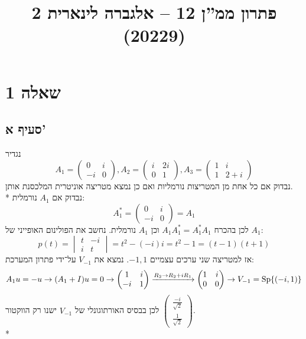 

\title{פתרון ממ''ן 12 – אלגברה לינארית 2 (20229)}


\maketitle

\section{שאלה 1}
\subsection{סעיף א'}
נגדיר
\[
	A_1 = \begin{pmatrix}
		0 & i \\
		-i & 0
	\end{pmatrix},
	A_2 = \begin{pmatrix}
		i & 2i \\
		0 & 1
	\end{pmatrix},
	A_3 = \begin{pmatrix}
		1 & i \\
		1 & 2 + i
	\end{pmatrix}
\]
נבדוק אם כל אחת מן המטריצות נורמליות ואם כן נמצא מטריצה אוניטרית המלכסנת אותן. \\*
נבדוק אם $A_1$ נורמלית:
\[
	A_1^* = \begin{pmatrix}
		0 & i \\
		-i & 0
	\end{pmatrix} = A_1
\]
לכן בהכרח $A_1 A_1^* = A_1^* A_1$ וכן $A_1$ נורמלית.
נחשב את הפולינום האופייני של $A_1$:
\[
	p(t) = \begin{vmatrix}
		t & -i \\
		i & t
	\end{vmatrix}
	= t^2 - (-i)i = t^2 - 1 = (t - 1)(t + 1)
\]
אז למטריצה שני ערכים עצמיים $-1, 1$.
נמצא את $V_{-1}$ על־ידי פתרון המערכת:
\[
	A_1 u = -u \rightarrow (A_1 + I) u = 0 \rightarrow \begin{pmatrix}
		1 & i \\
		-i & 1
	\end{pmatrix}
	\xrightarrow{R_2 \to R_2 + iR_1}
	\begin{pmatrix}
		1 & i \\
		0 & 0
	\end{pmatrix}
	\rightarrow
	V_{-1} = \operatorname{Sp}\{ (-i, 1) \}
\]
לכן בבסיס האורתוגונלי של $V_{-1}$ ישנו רק הווקטור $\begin{pmatrix} \frac{-i}{\sqrt{2}} \\ \frac{1}{\sqrt{2}} \end{pmatrix}$. \\*
